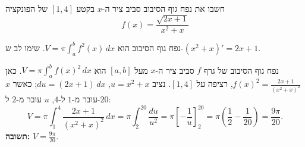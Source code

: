 
\begin{question}
חשבו את נפח גוף הסיבוב סביב ציר ה-$x$ בקטע $[1,4]$ של הפונקציה
\[ f(x) = \frac{\sqrt{2x+1}}{x^2 + x} \]
\end{question}

\begin{hint}
נפח גוף הסיבוב הוא $V = \pi\int_a^b f^2(x)\,dx$. שימו לב ש-$(x^2 + x)' = 2x + 1$.
\end{hint}

\begin{solution}
נפח גוף הסיבוב של גרף $f$ סביב ציר ה-$x$ מעל $[a,b]$ הוא $V = \pi\int_a^b f(x)^2\,dx$. כאן
$f(x)^2 = \frac{2x+1}{(x^2 + x)^2}$, רציפה על $[1,4]$. נציב $u = x^2 + x$, $du = (2x + 1)\,dx$; כאשר $x$ עובר מ-$1$ ל-$4$, $u$ עובר מ-$2$ ל-$20$:
\[ V = \pi\int_1^4\frac{2x+1}{(x^2+x)^2}\,dx = \pi\int_2^{20}\frac{du}{u^2} = \pi\left[-\frac1u\right]_2^{20} = \pi\left(\frac12 - \frac1{20}\right) = \frac{9\pi}{20}. \]
\textbf{תשובה:} $V = \frac{9\pi}{20}$.
\end{solution}

